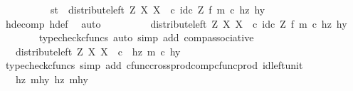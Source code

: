 \begin{isabellebody}
\ \ \isamarkupfalse%
\ {\isacharminus}{\kern0pt}\isanewline
\ \ \ \ \isamarkupfalse%
\ {\isachardoublequoteopen}{\isasymlangle}s{\isacharcomma}{\kern0pt}t{\isasymrangle}\ {\isacharequal}{\kern0pt}\ {\isacharparenleft}{\kern0pt}distribute{\isacharunderscore}{\kern0pt}left\ Z\ X\ X\ \ {\isasymcirc}\isactrlsub c\ id\isactrlsub c\ Z\ {\isasymtimes}\isactrlsub f\ m{\isacharparenright}{\kern0pt}\ {\isasymcirc}\isactrlsub c\ {\isasymlangle}hz{\isacharcomma}{\kern0pt}\ hy{\isasymrangle}{\isachardoublequoteclose}\isanewline
\ \ \ \ \ \ \isamarkupfalse%
\ h{\isacharunderscore}{\kern0pt}decomp\ h{\isacharunderscore}{\kern0pt}def\ \isamarkupfalse%
\ auto\isanewline
\ \ \ \ \isamarkupfalse%
\ \isamarkupfalse%
\ {\isachardoublequoteopen}{\isachardot}{\kern0pt}{\isachardot}{\kern0pt}{\isachardot}{\kern0pt}\ {\isacharequal}{\kern0pt}\ distribute{\isacharunderscore}{\kern0pt}left\ Z\ X\ X\ \ {\isasymcirc}\isactrlsub c\ {\isacharparenleft}{\kern0pt}id\isactrlsub c\ Z\ {\isasymtimes}\isactrlsub f\ m{\isacharparenright}{\kern0pt}\ {\isasymcirc}\isactrlsub c\ {\isasymlangle}hz{\isacharcomma}{\kern0pt}\ hy{\isasymrangle}{\isachardoublequoteclose}\isanewline
\ \ \ \ \ \ \isamarkupfalse%
\ {\isacharparenleft}{\kern0pt}typecheck{\isacharunderscore}{\kern0pt}cfuncs{\isacharcomma}{\kern0pt}\ auto\ simp\ add{\isacharcolon}{\kern0pt}\ comp{\isacharunderscore}{\kern0pt}associative{}{\isacharparenright}{\kern0pt}\isanewline
\ \ \ \ \isamarkupfalse%
\ \isamarkupfalse%
\ {\isachardoublequoteopen}{\isachardot}{\kern0pt}{\isachardot}{\kern0pt}{\isachardot}{\kern0pt}\ {\isacharequal}{\kern0pt}\ distribute{\isacharunderscore}{\kern0pt}left\ Z\ X\ X\ \ {\isasymcirc}\isactrlsub c\ {\isasymlangle}\ hz{\isacharcomma}{\kern0pt}\ m\ {\isasymcirc}\isactrlsub c\ hy{\isasymrangle}{\isachardoublequoteclose}\isanewline
\ \ \ \ \ \ \isamarkupfalse%
\ {\isacharparenleft}{\kern0pt}typecheck{\isacharunderscore}{\kern0pt}cfuncs{\isacharcomma}{\kern0pt}\ simp\ add{\isacharcolon}{\kern0pt}\ cfunc{\isacharunderscore}{\kern0pt}cross{\isacharunderscore}{\kern0pt}prod{\isacharunderscore}{\kern0pt}comp{\isacharunderscore}{\kern0pt}cfunc{\isacharunderscore}{\kern0pt}prod\ id{\isacharunderscore}{\kern0pt}left{\isacharunderscore}{\kern0pt}unit{}{\isacharparenright}{\kern0pt}\isanewline
\ \ \ \ \isamarkupfalse%
\ \isamarkupfalse%
\ {\isachardoublequoteopen}{\isachardot}{\kern0pt}{\isachardot}{\kern0pt}{\isachardot}{\kern0pt}\ {\isacharequal}{\kern0pt}\ {\isasymlangle}{\isasymlangle}hz{\isacharcomma}{\kern0pt}\ mhy{}{\isasymrangle}{\isacharcomma}{\kern0pt}\ {\isasymlangle}hz{\isacharcomma}{\kern0pt}\ mhy{}{\isasymrangle}{\isasymrangle}{\isachardoublequoteclose}\isanewline

\end{isabellebody}
